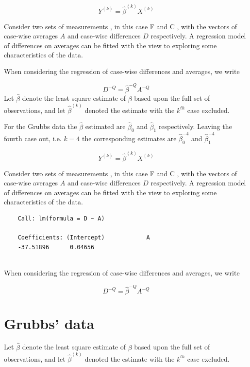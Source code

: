 \documentclass[12pt, a4paper]{report}
\theoremstyle{plain}
\theoremstyle{definition}
\theoremstyle{remark}
\begin{document}
	\begin{equation}
	Y^{(k)} = \hat{\beta}^{(k)}X^{(k)}
	\end{equation}
	
	Consider two sets of measurements , in this case F and C , with the vectors of case-wise averages $A$ and case-wise differences $D$ respectively. A regression model of differences on averages can be fitted with the view to exploring some characteristics of the data.
	
	When considering the regression of case-wise differences and averages, we write
	
	\begin{equation}
	D^{-Q} = \hat{\beta}^{-Q}A^{-Q}
	\end{equation}
	Let $\hat{\beta}$ denote the least square estimate of $\beta$ based upon the full set of observations, and let $\hat{\beta}^{(k)}$ denoted the estimate with the $k^{th}$ case excluded.
	
	For the Grubbs data the $\hat{\beta}$ estimated are $\hat{\beta}_{0}$ and $\hat{\beta}_{1}$ respectively. Leaving the
	fourth case out, i.e. $k=4$ the corresponding estimates are $\hat{\beta}_{0}^{-4}$ and $\hat{\beta}_{1}^{-4}$
	
	\begin{equation}
	Y^{(k)} = \hat{\beta}^{(k)}X^{(k)}
	\end{equation}
	
	Consider two sets of measurements , in this case F and C , with the vectors of case-wise averages $A$ and case-wise differences $D$ respectively. A regression model of differences on averages can be fitted with the view to exploring some characteristics of the data.
	
	\begin{verbatim}
	Call: lm(formula = D ~ A)
	
	Coefficients: (Intercept)            A
	-37.51896      0.04656
	
	\end{verbatim}
	
	
	
	
	When considering the regression of case-wise differences and averages, we write
	
	\begin{equation}
	D^{-Q} = \hat{\beta}^{-Q}A^{-Q}
	\end{equation}
	
	\section{Grubbs' data}
	Let $\hat{\beta}$ denote the least square estimate of $\beta$ based upon the full set of observations, and let
	$\hat{\beta}^{(k)}$ denoted the estimate with the $k^{th}$ case excluded.
	
\end{document}
